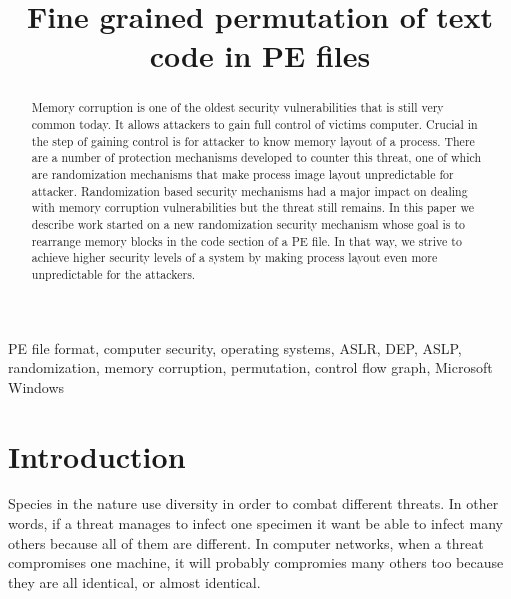 \documentclass[11pt,final,conference,a4paper]{IEEEtran}
\begin{document}
\IEEEoverridecommandlockouts

\title{Fine grained permutation of text code in PE files}

\author{
	}

\maketitle

\begin{abstract}
Memory corruption is one of the oldest security vulnerabilities
that is still very common today. It allows attackers to gain full
control of victims computer. Crucial in the step of gaining control
is for attacker to know memory layout of a process. There are a
number of protection mechanisms developed to counter this threat,
one of which are randomization mechanisms that make process image
layout unpredictable for attacker. Randomization based security
mechanisms had a major impact on dealing with memory corruption
vulnerabilities but the threat still remains. In this paper we
describe work started on a new randomization security mechanism
whose goal is to rearrange memory blocks in the code section of a
PE file. In that way, we strive to achieve higher security levels
of a system by making process layout even more unpredictable for
the attackers.
\end{abstract}

\begin{keywords}
PE file format, computer security, operating systems, ASLR, DEP, ASLP, randomization, memory corruption, permutation, control flow graph, Microsoft Windows
\end{keywords}

\section{Introduction}
\label{sec:intro}

Species in the nature use diversity in order to combat different
threats. In other words, if a threat manages to infect one specimen
it want be able to infect many others because all of them are
different. In computer networks, when a threat compromises one
machine, it will probably compromies many others too because they
are all identical, or almost identical.
\end{document}
